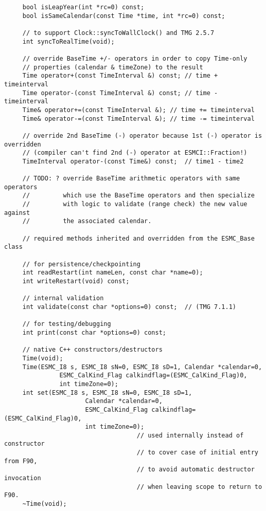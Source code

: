 {\begin{verbatim}
     bool isLeapYear(int *rc=0) const;
     bool isSameCalendar(const Time *time, int *rc=0) const;
 
     // to support Clock::syncToWallClock() and TMG 2.5.7
     int syncToRealTime(void);
 
     // override BaseTime +/- operators in order to copy Time-only
     // properties (calendar & timeZone) to the result
     Time operator+(const TimeInterval &) const; // time + timeinterval
     Time operator-(const TimeInterval &) const; // time - timeinterval
     Time& operator+=(const TimeInterval &); // time += timeinterval
     Time& operator-=(const TimeInterval &); // time -= timeinterval
 
     // override 2nd BaseTime (-) operator because 1st (-) operator is overridden
     // (compiler can't find 2nd (-) operator at ESMCI::Fraction!)
     TimeInterval operator-(const Time&) const;  // time1 - time2
 
     // TODO: ? override BaseTime arithmetic operators with same operators
     //         which use the BaseTime operators and then specialize
     //         with logic to validate (range check) the new value against
     //         the associated calendar.
 
     // required methods inherited and overridden from the ESMC_Base class
 
     // for persistence/checkpointing
     int readRestart(int nameLen, const char *name=0);
     int writeRestart(void) const;
 
     // internal validation
     int validate(const char *options=0) const;  // (TMG 7.1.1)
 
     // for testing/debugging
     int print(const char *options=0) const;
 
     // native C++ constructors/destructors
     Time(void);
     Time(ESMC_I8 s, ESMC_I8 sN=0, ESMC_I8 sD=1, Calendar *calendar=0,
               ESMC_CalKind_Flag calkindflag=(ESMC_CalKind_Flag)0,
               int timeZone=0);
     int set(ESMC_I8 s, ESMC_I8 sN=0, ESMC_I8 sD=1,
                      Calendar *calendar=0,
                      ESMC_CalKind_Flag calkindflag=(ESMC_CalKind_Flag)0,
                      int timeZone=0);
                                    // used internally instead of constructor
                                    // to cover case of initial entry from F90,
                                    // to avoid automatic destructor invocation
                                    // when leaving scope to return to F90.
     ~Time(void);
 

\end{verbatim}}
